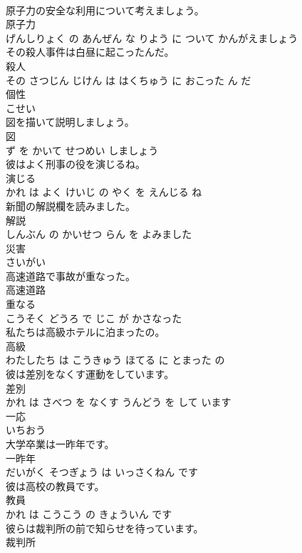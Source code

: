 \documentclass[8pt]{extreport}
\begin{document}
\begin{CJK}{UTF8}{min}
\\	原子力の安全な利用について考えましょう。	
\\	原子力 
\\	げんしりょく の あんぜん な りよう に ついて かんがえましょう			
\\	その殺人事件は白昼に起こったんだ。	
\\	殺人 
\\	その さつじん じけん は はくちゅう に おこった ん だ			
\\	個性	
\\	こせい			
\\	図を描いて説明しましょう。	
\\	図 
\\	ず を かいて せつめい しましょう			
\\	彼はよく刑事の役を演じるね。	
\\	演じる 
\\	かれ は よく けいじ の やく を えんじる ね			
\\	新聞の解説欄を読みました。	
\\	解説 
\\	しんぶん の かいせつ らん を よみました			
\\	災害	
\\	さいがい			
\\	高速道路で事故が重なった。	
\\	高速道路 
\\	重なる 
\\	こうそく どうろ で じこ が かさなった			
\\	私たちは高級ホテルに泊まったの。	
\\	高級 
\\	わたしたち は こうきゅう ほてる に とまった の			
\\	彼は差別をなくす運動をしています。	
\\	差別 
\\	かれ は さべつ を なくす うんどう を して います			
\\	一応	
\\	いちおう			
\\	大学卒業は一昨年です。	
\\	一昨年 
\\	だいがく そつぎょう は いっさくねん です			
\\	彼は高校の教員です。	
\\	教員 
\\	かれ は こうこう の きょういん です			
\\	彼らは裁判所の前で知らせを待っています。	
\\	裁判所 

\end{CJK}
\end{document}
